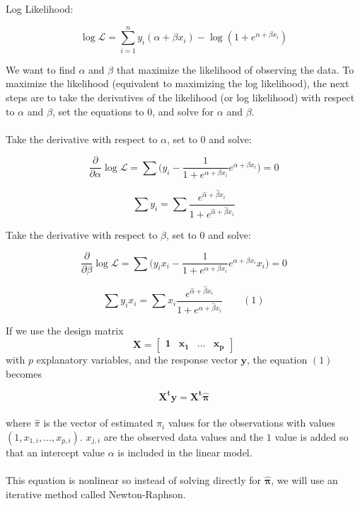 \documentclass[12pt,timesnewroman,letterpaper]{article}
\begin{document}
\noindent Log Likelihood:

$$\log \mathscr{L} = \sum_{i=1}^n y_i(\alpha + \beta x_i) - \log(1 + e^{\alpha + \beta x_i})$$

\noindent We want to find $\alpha$ and $\beta$ that maximize the likelihood of observing the data. To maximize the likelihood (equivalent to maximizing the log likelihood), the next steps are to take the derivatives of the likelihood (or log likelihood) with respect to $\alpha$ and $\beta$, set the equations to $0$, and solve for $\alpha$ and $\beta$.\\\\

\noindent Take the derivative with respect to $\alpha$, set to $0$ and solve:

$$
\dfrac{\partial}{\partial \alpha} \log \mathscr{L} = \sum \big(y_i - \dfrac{1}{1 + e^{\alpha + \beta x_i}}e^{\alpha + \beta x_i}\big) = 0
$$

$$
\sum y_i = \sum \dfrac{e^{\hat{\alpha} + \hat{\beta}x_i}}{1 + e^{\hat{\alpha} + \hat{\beta}x_i}}
$$

\noindent Take the derivative with respect to $\beta$, set to $0$ and solve:

$$
\dfrac{\partial}{\partial \beta} \log \mathscr{L} = \sum \big(y_i x_i - \dfrac{1}{1 + e^{\alpha + \beta x_i}}e^{\alpha + \beta x_i}x_i\big) = 0
$$

$$
\sum y_i x_i = \sum x_i \dfrac{e^{\hat{\alpha} + \hat{\beta} x_i}}{1 + e^{\hat{\alpha} + \hat{\beta} x_i}} \quad \quad (1)
$$

\noindent If we use the design matrix
$$
\boldsymbol{X} = \begin{bmatrix}
    \boldsymbol{1}       & \boldsymbol{x_1} & \dots & \boldsymbol{x_p}
\end{bmatrix}
$$
with $p$ explanatory variables, and the response vector $\boldsymbol{y}$, the equation $(1)$ becomes

$$
\boldsymbol{X^t y} = \boldsymbol{X^t \hat{\pi}}
$$
\\
where $\hat{\pi}$ is the vector of estimated $\pi_i$ values for the observations with values $(1, x_{1,i}, \ldots, x_{p,i})$. $x_{j,i}$ are the observed data values and the $1$ value is added so that an intercept value $\alpha$ is included in the linear model. 
\\\\
This equation is nonlinear so instead of solving directly for $\boldsymbol{\hat{\pi}}$, we will use an iterative method called Newton-Raphson.
\end{document}
